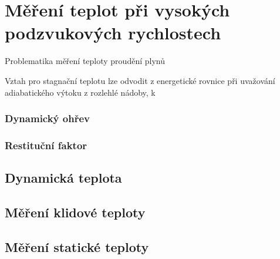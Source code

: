\section{Měření teplot při vysokých podzvukových rychlostech} \label{sec:mereni-teplot}
    Problematika měření teploty proudění plynů 

    Vztah pro stagnační teplotu lze odvodit z energetické rovnice při uvažování adiabatického výtoku z rozlehlé nádoby, k




    \subsubsection{Dynamický ohřev}
    \subsubsection{Restituční faktor}
    
    \subsection{Dynamická teplota}

    \subsection{Měření klidové teploty}

    \subsection{Měření statické teploty}